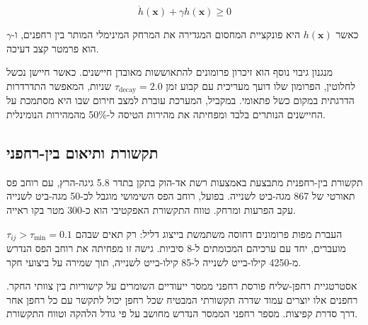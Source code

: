 \begin{equation}
\dot{h}(\mathbf{x}) + \gamma h(\mathbf{x}) \geq 0
\label{eq:ch07_cbf}
\end{equation}

כאשר $h(\mathbf{x})$ היא פונקציית המחסום המגדירה את המרחק המינימלי המותר בין רחפנים, ו-$\gamma$ הוא פרמטר קצב דעיכה.

מנגנון גיבוי נוסף הוא זיכרון פרומונים להתאוששות מאובדן חיישנים. כאשר חיישן נכשל לחלוטין, הפרומון שלו דועך מעריכית עם קבוע זמן $\tau_{\text{decay}} = 2.0$ שניות, המאפשר התדרדרות הדרגתית במקום כשל פתאומי. במקביל, המערכת עוברת למצב חירום שבו היא מסתמכת על החיישנים הנותרים בלבד ומפחיתה את מהירות הטיסה ל-50\% מהמהירות הנומינלית.

\subsection{תקשורת ותיאום בין-רחפני}
\label{sec:ch07_communication}

תקשורת בין-רחפנית מתבצעת באמצעות רשת  אד-הוק בתקן  בתדר 5.8 גיגה-הרץ, עם רוחב פס תאורטי של 867 מגה-ביט לשנייה. בפועל, רוחב הפס השימושי מוגבל לכ-50 מגה-ביט לשנייה עקב הפרעות ומרחק. טווח התקשורת האפקטיבי הוא כ-300 מטר בקו ראייה.

העברת מפות פרומונים דחוסה משתמשת בייצוג דליל: רק תאים שבהם $\tau_{ij} > \tau_{\text{min}} = 0.1$ מועברים, יחד עם ערכיהם המכומתים ל-8 סיביות. גישה זו מפחיתה את רוחב הפס הנדרש מ-4250 קילו-בייט לשנייה ל-85 קילו-בייט לשנייה, תוך שמירה על ביצועי חקר.

אסטרטגיית רחפן-שליח פורסת רחפני ממסר ייעודיים השומרים על קישוריות בין צוותי החקר. רחפנים אלו יוצרים עמוד שדרה תקשורתי המבטיח שכל רחפן יכול לתקשר עם כל רחפן אחר דרך סדרת קפיצות. מספר רחפני הממסר הנדרש מחושב על פי גודל הלהקה וטווח התקשורת.

\begin{table}[htbp]
\centering
\caption{ניתוח עלות תקשורת לאסטרטגיות שונות.}
\label{tab:ch07_comm_overhead}
\end{table}

